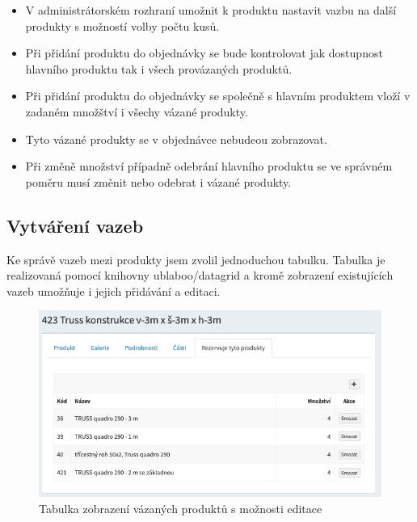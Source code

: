 \begin{itemize}
    \item V administrátorském rozhraní umožnit k produktu nastavit vazbu na další produkty s možností volby počtu kusů.
    \item Při přidání produktu do objednávky se bude kontrolovat jak dostupnost hlavního produktu tak i všech provázaných produktů.
    \item Při přidání produktu do objednávky se společně s hlavním produktem vloží v zadaném množštví i všechy vázané produkty.
    \item Tyto vázané produkty se v objednávce nebudeou zobrazovat.
    \item Při změně množství případně odebrání hlavního produktu se ve správném poměru musí změnit nebo odebrat i vázané produkty.

\end{itemize}

\subsection{Vytváření vazeb}

Ke správě vazeb mezi produkty jsem zvolil jednoduchou tabulku. Tabulka je realizovaná pomocí knihovny ublaboo/datagrid \cite{contributteContributteDatagrid} a kromě zobrazení existujících vazeb umožňuje i jejich přidávání a editaci.

\begin{figure}
    \centering
    \includegraphics[width=0.75\linewidth]{vazane-produkty.png}
    \caption{Tabulka zobrazení vázaných produktů s možnosti editace}
    \label{fig:enter-label}
\end{figure}



